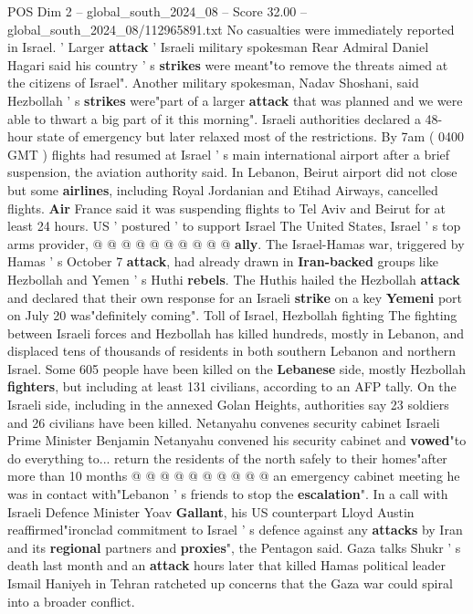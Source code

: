 \begin{textsample}{POS Dim 2 – global\_south\_2024\_08 – Score 32.00 – global\_south\_2024\_08/112965891.txt}
No casualties were immediately reported in Israel. ' Larger \textbf{attack} ' Israeli military spokesman Rear Admiral Daniel Hagari said his country ' s \textbf{strikes} were meant"to remove the threats aimed at the citizens of Israel".
Another military spokesman, Nadav Shoshani, said Hezbollah ' s \textbf{strikes} were"part of a larger \textbf{attack} that was planned and we were able to thwart a big part of it this morning".
Israeli authorities declared a 48-hour state of emergency but later relaxed most of the restrictions.
By 7am ( 0400 GMT ) flights had resumed at Israel ' s main international airport after a brief suspension, the aviation authority said.
In Lebanon, Beirut airport did not close but some \textbf{airlines}, including Royal Jordanian and Etihad Airways, cancelled flights. \textbf{Air} France said it was suspending flights to Tel Aviv and Beirut for at least 24 hours.
US ' postured ' to support Israel The United States, Israel ' s top arms provider, @ @ @ @ @ @ @ @ @ @ \textbf{ally}.
The Israel-Hamas war, triggered by Hamas ' s October 7 \textbf{attack}, had already drawn in \textbf{Iran-backed} groups like Hezbollah and Yemen ' s Huthi \textbf{rebels}.
The Huthis hailed the Hezbollah \textbf{attack} and declared that their own response for an Israeli \textbf{strike} on a key \textbf{Yemeni} port on July 20 was"definitely coming".
Toll of Israel, Hezbollah fighting The fighting between Israeli forces and Hezbollah has killed hundreds, mostly in Lebanon, and displaced tens of thousands of residents in both southern Lebanon and northern Israel.
Some 605 people have been killed on the \textbf{Lebanese} side, mostly Hezbollah \textbf{fighters}, but including at least 131 civilians, according to an AFP tally.
On the Israeli side, including in the annexed Golan Heights, authorities say 23 soldiers and 26 civilians have been killed.
Netanyahu convenes security cabinet Israeli Prime Minister Benjamin Netanyahu convened his security cabinet and \textbf{vowed}"to do everything to... return the residents of the north safely to their homes"after more than 10 months @ @ @ @ @ @ @ @ @ @ an emergency cabinet meeting he was in contact with"Lebanon ' s friends to stop the \textbf{escalation}".
In a call with Israeli Defence Minister Yoav \textbf{Gallant}, his US counterpart Lloyd Austin reaffirmed"ironclad commitment to Israel ' s defence against any \textbf{attacks} by Iran and its \textbf{regional} partners and \textbf{proxies}", the Pentagon said.
Gaza talks Shukr ' s death last month and an \textbf{attack} hours later that killed Hamas political leader Ismail Haniyeh in Tehran ratcheted up concerns that the Gaza war could spiral into a broader conflict.

\end{textsample}

